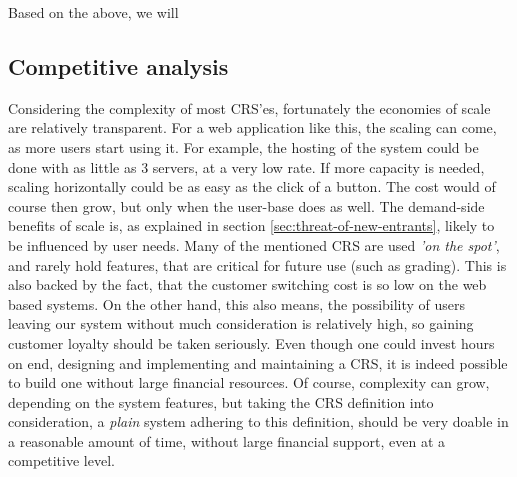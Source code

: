 Based on the above, we will 

\subsection{Competitive analysis}










% 

Considering the complexity of most CRS'es, fortunately the economies of scale are relatively transparent. For a web application like this, the scaling can come, as more users start using it. For example, the hosting of the system could be done with as little as 3 servers, at a very low rate. If more capacity is needed, scaling horizontally could be as easy as the click of a button. The cost would of course then grow, but only when the user-base does as well.
The demand-side benefits of scale is, as explained in section \ref{sec:threat-of-new-entrants}, likely to be influenced by user needs. Many of the mentioned CRS are used \emph{'on the spot'}, and rarely hold features, that are critical for future use (such as grading). This is also backed by the fact, that the customer switching cost is so low on the web based systems. On the other hand, this also means, the possibility of users leaving our system without much consideration is relatively high, so gaining customer loyalty should be taken seriously.
Even though one could invest hours on end, designing and implementing and maintaining a CRS, it is indeed possible to build one without large financial resources. Of course, complexity can grow, depending on the system features, but taking the CRS definition into consideration, a \emph{plain} system adhering to this definition, should be very doable in a reasonable amount of time, without large financial support, even at a competitive level.

